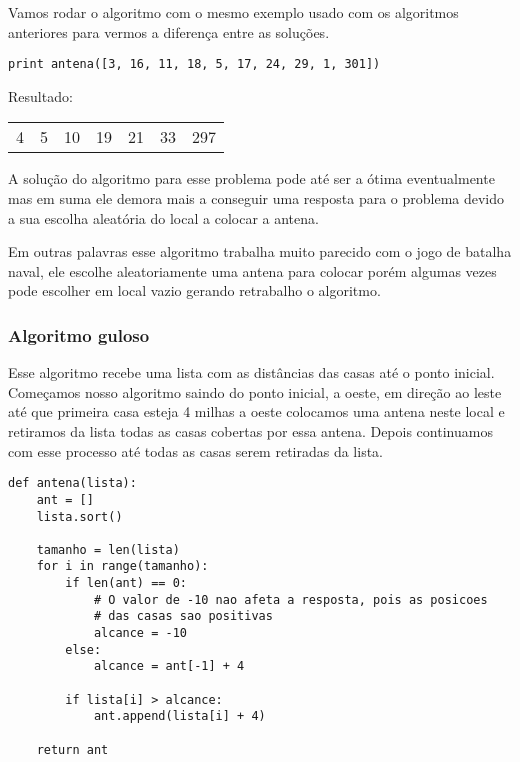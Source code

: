 \documentclass[11pt]{article}
\begin{document}
Vamos rodar o algoritmo com o mesmo exemplo usado com os algoritmos
anteriores para vermos a diferença entre as soluções.


\begin{verbatim}
print antena([3, 16, 11, 18, 5, 17, 24, 29, 1, 301])
\end{verbatim}

Resultado:
\begin{center}
\begin{tabular}{rrrrrrr}
4 & 5 & 10 & 19 & 21 & 33 & 297\\
\end{tabular}
\end{center}

A solução do algoritmo para esse problema pode até ser a ótima
eventualmente mas em suma ele demora mais a conseguir uma resposta
para o problema devido a sua escolha aleatória do local a colocar a
antena.

Em outras palavras esse algoritmo trabalha muito parecido com o jogo
de batalha naval, ele escolhe aleatoriamente uma antena para colocar
porém algumas vezes pode escolher em local vazio gerando retrabalho o
algoritmo.

\subsubsection{Algoritmo guloso}
\label{sec-5-3-3}
\label{sec-3-3}

Esse algoritmo recebe uma lista com as distâncias das casas até o
ponto inicial. Começamos nosso algoritmo saindo do ponto inicial,
a oeste, em direção ao leste até que primeira casa esteja 4 milhas a
oeste colocamos uma antena neste local e retiramos da lista todas as
casas cobertas por essa antena. Depois continuamos com esse processo
até todas as casas serem retiradas da lista.

\begin{verbatim}
def antena(lista):
    ant = []
    lista.sort()

    tamanho = len(lista)
    for i in range(tamanho):
        if len(ant) == 0:
            # O valor de -10 nao afeta a resposta, pois as posicoes
            # das casas sao positivas
            alcance = -10
        else:
            alcance = ant[-1] + 4

        if lista[i] > alcance:
            ant.append(lista[i] + 4)

    return ant
\end{verbatim}
\end{document}
